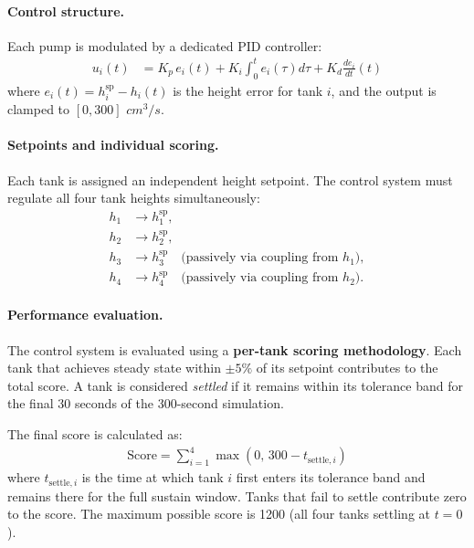 \documentclass[11pt]{article}
\begin{document}
\paragraph{Control structure.}
Each pump is modulated by a dedicated PID controller:
\begin{align}
u_i(t) &= K_p \, e_i(t) + K_i \int_0^t e_i(\tau) d\tau + K_d \frac{de_i}{dt}(t)
\end{align}
where \(e_i(t) = h_i^{\mathrm{sp}} - h_i(t)\) is the height error for tank \(i\), and the output is clamped to \([0, 300]\) \(\si{cm^3/s}\).

\paragraph{Setpoints and individual scoring.}
Each tank is assigned an independent height setpoint. The control system must regulate all four tank heights simultaneously:
\begin{align*}
h_1 &\to h_1^{\mathrm{sp}},\\
h_2 &\to h_2^{\mathrm{sp}},\\
h_3 &\to h_3^{\mathrm{sp}} \quad \text{(passively via coupling from } h_1 \text{)},\\
h_4 &\to h_4^{\mathrm{sp}} \quad \text{(passively via coupling from } h_2 \text{)}.
\end{align*}

\paragraph{Performance evaluation.}
The control system is evaluated using a \textbf{per-tank scoring methodology}. Each tank that achieves steady state within \(\pm 5\%\) of its setpoint contributes to the total score. A tank is considered \textit{settled} if it remains within its tolerance band for the final 30 seconds of the 300-second simulation.

The final score is calculated as:
\begin{align}
\text{Score} = \sum_{i=1}^{4} \max(0, \, 300 - t_{\mathrm{settle},i})
\end{align}
where \(t_{\mathrm{settle},i}\) is the time at which tank \(i\) first enters its tolerance band and remains there for the full sustain window. Tanks that fail to settle contribute zero to the score. The maximum possible score is 1200 (all four tanks settling at \(t=0\)).
\end{document}
